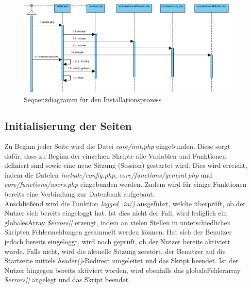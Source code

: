 \documentclass[fontsize = 12pt, paper = a4]{scrreprt}
\begin{document}
\begin{figure}[h]
\centering
\includegraphics[scale = 0.6]{installation}
\caption[Sequenzdiagramm f\"{u}r den Installationsprozess]{Sequenzdiagramm f\"{u}r den Installationsprozess}
\label{install}
\end{figure}

\newpage
\subsection{Initialisierung der Seiten}
Zu Beginn jeder Seite wird die Datei \textit{core/init.php} eingebunden. Diese sorgt dafür, dass zu Beginn der einzelnen Skripte alle Variablen und Funktionen definiert sind sowie eine neue Sitzung (Session) gestartet wird. Dies wird erreicht, indem die Dateien \textit{include/config.php}, \textit{core/functions/general.php} und \textit{core/functions/users.php} eingebunden werden. Zudem wird für einige Funktionen bereits eine Verbindung zur Datenbank aufgebaut.\\
Anschließend wird die Funktion \textit{logged\_in()} ausgeführt, welche überprüft, ob der Nutzer sich bereits eingeloggt hat. Ist dies nicht der Fall, wird lediglich ein \glqq globales\grqq Array \textit{\$errors[]} erzeugt, indem an vielen Stellen in unterschiedlichen Skripten Fehlermeldungen gesammelt werden können. Hat sich der Benutzer jedoch bereits eingeloggt, wird noch geprüft, ob der Nutzer bereits aktiviert wurde. Falls nicht, wird die aktuelle Sitzung zerstört, der Benutzer auf die Startseite mittels \textit{header()}-Redirect umgeleitet und das Skript beendet. Ist der Nutzer hingegen bereits aktiviert worden, wird ebenfalls das \glqq globale\grqq Fehlerarray \textit{\$errors[]} angelegt und das Skript beendet.
\end{document}
